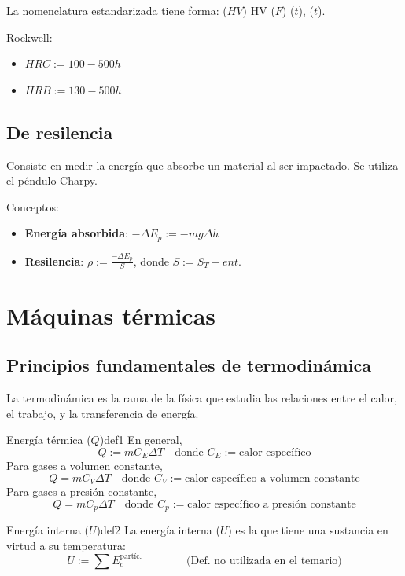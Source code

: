 \documentclass[10pt]{article}
\begin{document}
La nomenclatura estandarizada tiene forma: ($HV$) HV ($F$) ($t$), ($t$).

Rockwell:

\begin{itemize}
  \item $ HRC := 100 - 500h $
  \item $ HRB := 130 - 500h $
\end{itemize}

\subsection{De resilencia}

Consiste en medir la energía que absorbe un material al ser impactado. Se utiliza el péndulo Charpy.

Conceptos:

\begin{itemize}
  \item \textbf{Energía absorbida}: $ -\Delta E_p := - m g \Delta h $
  \item \textbf{Resilencia}: $ \rho := \frac{-\Delta E_p}{S}$, donde $ S := S_T - ent. $
\end{itemize}

\section{Máquinas térmicas}

\subsection{Principios fundamentales de termodinámica}

La termodinámica es la rama de la física que estudia las relaciones entre el calor, el trabajo, y la transferencia de energía.

\begin{definition}{Energía térmica ($ Q $)}{def1}
    En general,
    \[ Q := m C_E \Delta T \quad \text{donde } C_E := \text{calor específico} \]
    Para gases a volumen constante,
    \[ Q = m C_V \Delta T \quad \text{donde } C_V := \text{calor específico a volumen constante} \]
    Para gases a presión constante,
    \[ Q = m C_p \Delta T \quad \text{donde } C_p := \text{calor específico a presión constante} \]
\end{definition}

\begin{definition}{Energía interna ($ U $)}{def2}
    La energía interna ($ U $) es la que tiene una sustancia en virtud a su temperatura:
    \[ U := \sum E_c^{\text{partíc.}} \qquad\qquad \text{(Def. no utilizada en el temario)} \]
\end{definition}
\end{document}

